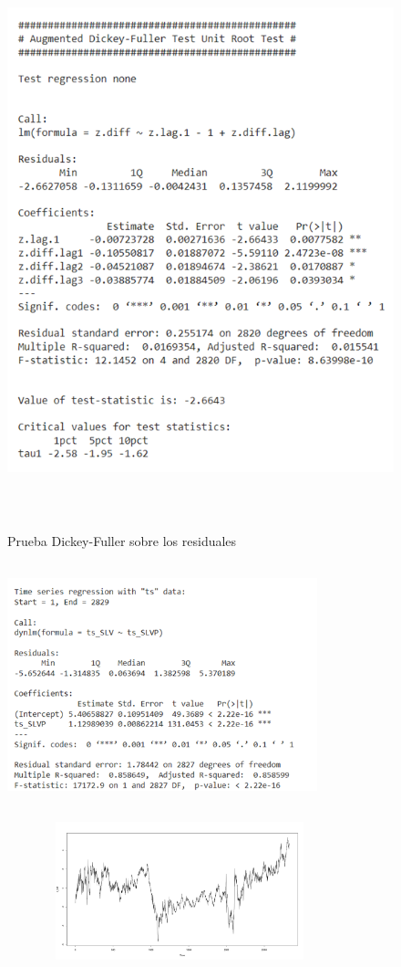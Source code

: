 \documentclass[11pt]{article}
\begin{document}
    \begin{figure}[!ht]
      \centering
      \includegraphics[width=13cm, height=16cm]{Imagenes/DF residualesEG.png}
      \label{fig:Anexo}
       \caption{Prueba Dickey-Fuller sobre los residuales}
      \vspace{0cm}
    \end{figure}
    \begin{figure}[!ht]
      \centering
      \includegraphics[width=9cm, height=7cm]{Imagenes/MCO.png}
      \label{fig:Anexo}
      \vspace{0cm}
    \end{figure}
    \begin{figure}[!ht]
      \centering
      \includegraphics[width=10cm, height=4cm]{Imagenes/z_hat.png}
      \label{fig:Anexo}
      \vspace{0cm}
    \end{figure}
    
\end{document}
